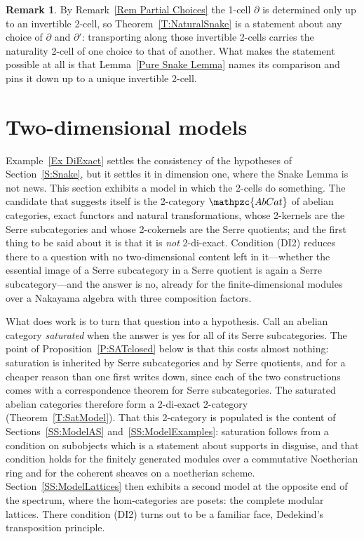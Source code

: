 \documentclass[reqno,a4paper]{amsart}
\numberwithin{equation}{section}
\theoremstyle{plain}
\theoremstyle{definition}
\newtheorem{remark}[subsection]{Remark}
\def\nameit#1{\textrm{#1}~}
\def\thex{\nameit{Theorem}}
\def\prox{\nameit{Proposition}}
\def\lemx{\nameit{Lemma}}
\def\remx{\nameit{Remark}}
\def\exax{\nameit{Example}}
\newcommand{\catfont}[1]{\ensuremath{\mathpzc{#1}}\xspace}
\newcommand{\AbCat}{\catfont{AbCat}}
\renewcommand{\1}{\onecat{1}}
\begin{document}
\begin{remark}\label{Rem Naturality Choices}
	By \remx\ref{Rem Partial Choices} the 1-cell \(\partial\) is determined only up to an invertible 2-cell, so \thex\ref{T:NaturalSnake} is a statement about any choice of \(\partial\) and \(\partial'\): transporting along those invertible 2-cells carries the naturality 2-cell of one choice to that of another. What makes the statement possible at all is that \lemx\ref{Pure Snake Lemma} names its comparison and pins it down up to a unique invertible 2-cell.
\end{remark}


\section{Two-dimensional models}\label{S:Model}

\exax\ref{Ex DiExact} settles the consistency of the hypotheses of Section~\ref{S:Snake}, but it settles it in dimension one, where the Snake Lemma is not news. This section exhibits a model in which the 2-cells do something. The candidate that suggests itself is the 2-category \(\AbCat\) of abelian categories, exact functors and natural transformations, whose 2-kernels are the Serre subcategories and whose 2-cokernels are the Serre quotients; and the first thing to be said about it is that it is \emph{not} 2-di-exact. Condition \textup{(DI2)} reduces there to a question with no two-dimensional content left in it---whether the essential image of a Serre subcategory in a Serre quotient is again a Serre subcategory---and the answer is no, already for the finite-dimensional modules over a Nakayama algebra with three composition factors.

What does work is to turn that question into a hypothesis. Call an abelian category \emph{saturated} when the answer is yes for all of its Serre subcategories. The point of \prox\ref{P:SATclosed} below is that this costs almost nothing: saturation is inherited by Serre subcategories and by Serre quotients, and for a cheaper reason than one first writes down, since each of the two constructions comes with a correspondence theorem for Serre subcategories. The saturated abelian categories therefore form a 2-di-exact 2-category (\thex\ref{T:SatModel}). That this 2-category is populated is the content of Sections~\ref{SS:ModelAS} and~\ref{SS:ModelExamples}: saturation follows from a condition on subobjects which is a statement about supports in disguise, and that condition holds for the finitely generated modules over a commutative Noetherian ring and for the coherent sheaves on a noetherian scheme. Section~\ref{SS:ModelLattices} then exhibits a second model at the opposite end of the spectrum, where the hom-categories are posets: the complete modular lattices. There condition \textup{(DI2)} turns out to be a familiar face, Dedekind's transposition principle.
\end{document}
